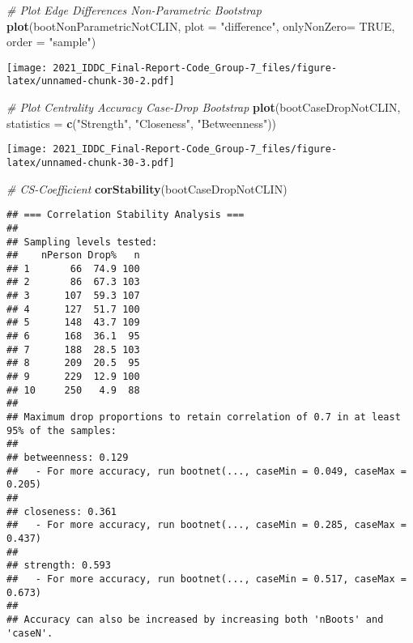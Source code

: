 \documentclass[
]{article}
\newenvironment{Shaded}{\begin{snugshade}}{\end{snugshade}}
\newcommand{\CommentTok}[1]{\textcolor[rgb]{0.56,0.35,0.01}{\textit{#1}}}
\newcommand{\DataTypeTok}[1]{\textcolor[rgb]{0.13,0.29,0.53}{#1}}
\newcommand{\KeywordTok}[1]{\textcolor[rgb]{0.13,0.29,0.53}{\textbf{#1}}}
\newcommand{\NormalTok}[1]{#1}
\newcommand{\OtherTok}[1]{\textcolor[rgb]{0.56,0.35,0.01}{#1}}
\newcommand{\StringTok}[1]{\textcolor[rgb]{0.31,0.60,0.02}{#1}}
\begin{document}
\begin{Shaded}
\begin{Highlighting}[]
\CommentTok{# Plot Edge Differences Non-Parametric Bootstrap}
\KeywordTok{plot}\NormalTok{(bootNonParametricNotCLIN,}
     \DataTypeTok{plot =} \StringTok{"difference"}\NormalTok{,}
     \DataTypeTok{onlyNonZero=} \OtherTok{TRUE}\NormalTok{,}
     \DataTypeTok{order =} \StringTok{"sample"}\NormalTok{)}
\end{Highlighting}
\end{Shaded}

\texttt{[image: 2021\_IDDC\_Final-Report-Code\_Group-7\_files/figure-latex/unnamed-chunk-30-2.pdf]}

\begin{Shaded}
\begin{Highlighting}[]
\CommentTok{# Plot Centrality Accuracy Case-Drop Bootstrap}
\KeywordTok{plot}\NormalTok{(bootCaseDropNotCLIN,}
     \DataTypeTok{statistics =} \KeywordTok{c}\NormalTok{(}\StringTok{"Strength"}\NormalTok{, }\StringTok{"Closeness"}\NormalTok{, }\StringTok{"Betweenness"}\NormalTok{))}
\end{Highlighting}
\end{Shaded}

\texttt{[image: 2021\_IDDC\_Final-Report-Code\_Group-7\_files/figure-latex/unnamed-chunk-30-3.pdf]}

\begin{Shaded}
\begin{Highlighting}[]
\CommentTok{# CS-Coefficient}
\KeywordTok{corStability}\NormalTok{(bootCaseDropNotCLIN)}
\end{Highlighting}
\end{Shaded}

\begin{verbatim}
## === Correlation Stability Analysis === 
## 
## Sampling levels tested:
##    nPerson Drop%   n
## 1       66  74.9 100
## 2       86  67.3 103
## 3      107  59.3 107
## 4      127  51.7 100
## 5      148  43.7 109
## 6      168  36.1  95
## 7      188  28.5 103
## 8      209  20.5  95
## 9      229  12.9 100
## 10     250   4.9  88
## 
## Maximum drop proportions to retain correlation of 0.7 in at least 95% of the samples:
## 
## betweenness: 0.129 
##   - For more accuracy, run bootnet(..., caseMin = 0.049, caseMax = 0.205) 
## 
## closeness: 0.361 
##   - For more accuracy, run bootnet(..., caseMin = 0.285, caseMax = 0.437) 
## 
## strength: 0.593 
##   - For more accuracy, run bootnet(..., caseMin = 0.517, caseMax = 0.673) 
## 
## Accuracy can also be increased by increasing both 'nBoots' and 'caseN'.
\end{verbatim}
\end{document}

